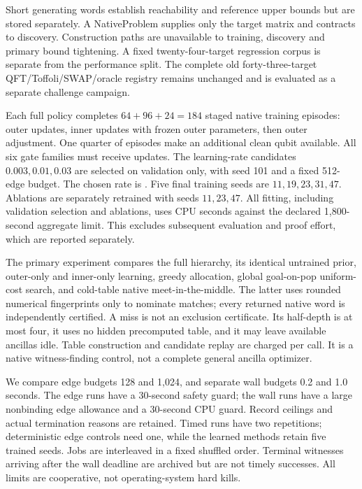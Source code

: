 \documentclass[11pt]{article}
\begin{document}
Short generating words establish reachability and reference upper bounds but are stored separately. A NativeProblem supplies only the target matrix and contracts to discovery. Construction paths are unavailable to training, discovery and primary bound tightening. A fixed twenty-four-target regression corpus is separate from the performance split. The complete old forty-three-target QFT/Toffoli/SWAP/oracle registry remains unchanged and is evaluated as a separate challenge campaign.

Each full policy completes $64+96+24=184$ staged native training episodes: outer updates, inner updates with frozen outer parameters, then outer adjustment. One quarter of episodes make an additional clean qubit available. All six gate families must receive updates. The learning-rate candidates $0.003,0.01,0.03$ are selected on validation only, with seed 101 and a fixed 512-edge budget. The chosen rate is \SelectedAlpha{}. Five final training seeds are $11,19,23,31,47$. Ablations are separately retrained with seeds $11,23,47$. All fitting, including validation selection and ablations, uses \FittingCPU{} CPU seconds against the declared 1,800-second aggregate limit. This excludes subsequent evaluation and proof effort, which are reported separately.

The primary experiment compares the full hierarchy, its identical untrained prior, outer-only and inner-only learning, greedy allocation, global goal-on-pop uniform-cost search, and cold-table native meet-in-the-middle. The latter uses rounded numerical fingerprints only to nominate matches; every returned native word is independently certified. A miss is not an exclusion certificate. Its half-depth is at most four, it uses no hidden precomputed table, and it may leave available ancillas idle. Table construction and candidate replay are charged per call. It is a native witness-finding control, not a complete general ancilla optimizer.

We compare edge budgets 128 and 1,024, and separate wall budgets 0.2 and 1.0 seconds. The edge runs have a 30-second safety guard; the wall runs have a large nonbinding edge allowance and a 30-second CPU guard. Record ceilings and actual termination reasons are retained. Timed runs have two repetitions; deterministic edge controls need one, while the learned methods retain five trained seeds. Jobs are interleaved in a fixed shuffled order. Terminal witnesses arriving after the wall deadline are archived but are not timely successes. All limits are cooperative, not operating-system hard kills.
\end{document}
